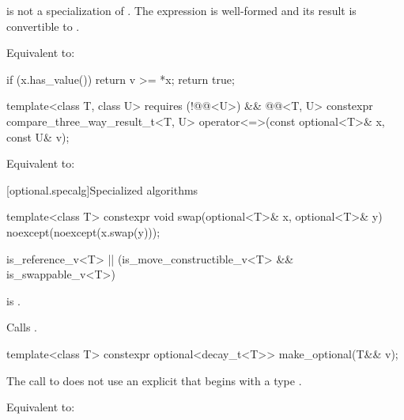 \begin{itemdescr}
\pnum
\constraints
{} is not a specialization of .
The expression  is well-formed and
its result is convertible to .

\pnum
\effects
Equivalent to:
\begin{codeblock}
if (x.has_value())
  return v >= *x;
return true;
\end{codeblock}
\end{itemdescr}

%
\begin{itemdecl}
template<class T, class U>
    requires (!@@<U>) && @@<T, U>
  constexpr compare_three_way_result_t<T, U>
    operator<=>(const optional<T>& x, const U& v);
\end{itemdecl}

\begin{itemdescr}
\pnum
\effects
Equivalent to: 
\end{itemdescr}

[optional.specalg]{Specialized algorithms}

%
\begin{itemdecl}
template<class T>
  constexpr void swap(optional<T>& x, optional<T>& y) noexcept(noexcept(x.swap(y)));
\end{itemdecl}

\begin{itemdescr}
\pnum
\constraints
\begin{codeblock}
is_reference_v<T> || (is_move_constructible_v<T> && is_swappable_v<T>)
\end{codeblock}
is .

\pnum
\effects
Calls .
\end{itemdescr}

%
\begin{itemdecl}
template<class T> constexpr optional<decay_t<T>> make_optional(T&& v);
\end{itemdecl}

\begin{itemdescr}
\pnum
\constraints
The call to  does not use
an explicit  that
begins with a type .

\pnum
\effects
Equivalent to: 
\end{itemdescr}

